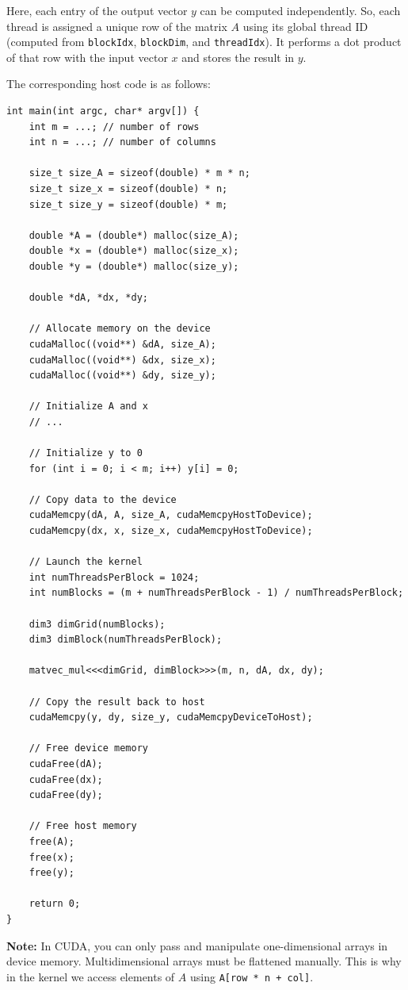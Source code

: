 \documentclass[12pt]{book}
\begin{document}
Here, each entry of the output vector $y$ can be computed independently. So, each thread is assigned a unique row of the matrix $A$ using its global thread ID (computed from \texttt{blockIdx}, \texttt{blockDim}, and \texttt{threadIdx}). It performs a dot product of that row with the input vector $x$ and stores the result in $y$.

The corresponding host code is as follows:

\begin{lstlisting}[style=cppstyle]
int main(int argc, char* argv[]) {
    int m = ...; // number of rows
    int n = ...; // number of columns

    size_t size_A = sizeof(double) * m * n;
    size_t size_x = sizeof(double) * n;
    size_t size_y = sizeof(double) * m;

    double *A = (double*) malloc(size_A);
    double *x = (double*) malloc(size_x);
    double *y = (double*) malloc(size_y);

    double *dA, *dx, *dy;

    // Allocate memory on the device
    cudaMalloc((void**) &dA, size_A);
    cudaMalloc((void**) &dx, size_x);
    cudaMalloc((void**) &dy, size_y);

    // Initialize A and x
    // ...

    // Initialize y to 0
    for (int i = 0; i < m; i++) y[i] = 0;

    // Copy data to the device
    cudaMemcpy(dA, A, size_A, cudaMemcpyHostToDevice);
    cudaMemcpy(dx, x, size_x, cudaMemcpyHostToDevice);

    // Launch the kernel
    int numThreadsPerBlock = 1024;
    int numBlocks = (m + numThreadsPerBlock - 1) / numThreadsPerBlock;

    dim3 dimGrid(numBlocks);
    dim3 dimBlock(numThreadsPerBlock);

    matvec_mul<<<dimGrid, dimBlock>>>(m, n, dA, dx, dy);

    // Copy the result back to host
    cudaMemcpy(y, dy, size_y, cudaMemcpyDeviceToHost);

    // Free device memory
    cudaFree(dA);
    cudaFree(dx);
    cudaFree(dy);

    // Free host memory
    free(A);
    free(x);
    free(y);

    return 0;
}
\end{lstlisting}

\noindent
\textbf{Note:} In CUDA, you can only pass and manipulate one-dimensional arrays in device memory. Multidimensional arrays must be flattened manually. This is why in the kernel we access elements of $A$ using \texttt{A[row * n + col]}.
\end{document}
